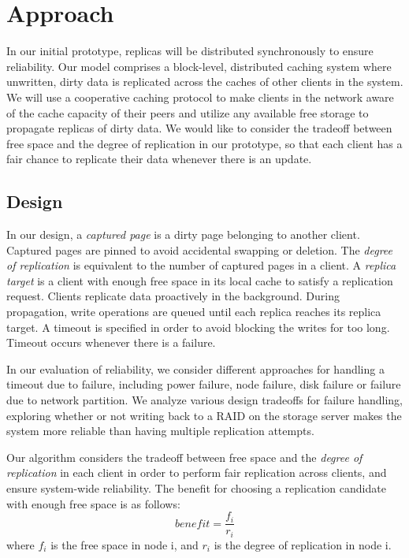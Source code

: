 \section{Approach}

In our initial prototype, replicas will be distributed
synchronously to ensure reliability. Our model comprises a
block-level, distributed caching system where unwritten,
dirty data is replicated across the caches of other
clients in the system. We will use a cooperative caching
protocol to make clients in the network aware of the cache
capacity of their peers and utilize any available free
storage to propagate replicas of dirty data. We would like
to consider the tradeoff between free space and the degree
of replication in our prototype, so that each client has a
fair chance to replicate their data whenever there is
an update.


\subsection{Design}

In our design, a \textit{captured page} is a dirty page
belonging to another client. Captured pages are pinned to
avoid accidental swapping or deletion. The
\textit{degree of replication} is equivalent to the number
of captured pages in a client. A
\textit{replica target} is a client with enough
free space in its local cache to satisfy
a replication request. Clients replicate data proactively
in the background. During propagation, write
operations are queued until each replica reaches its
replica target. A timeout is specified in order to
avoid blocking the writes for too long. Timeout occurs
whenever there is a failure.

In our evaluation of reliability, we consider different
approaches for handling a timeout due to failure, including
power failure, node failure, disk failure or failure due to
network partition. We analyze various design tradeoffs for
failure handling, exploring whether or not writing back to
a RAID on the storage server makes the system more reliable
than having multiple replication attempts.

Our algorithm considers the tradeoff between free
space and the \textit{degree of replication} in each
client in order to perform fair replication across clients,
and ensure system-wide reliability. The benefit for
choosing a replication candidate with enough free space is
as follows: \[{benefit}=\frac{f_i}{r_i}\] where
$f_i$ is the free space in node i, and $r_i$ is the degree
of replication in node i.

